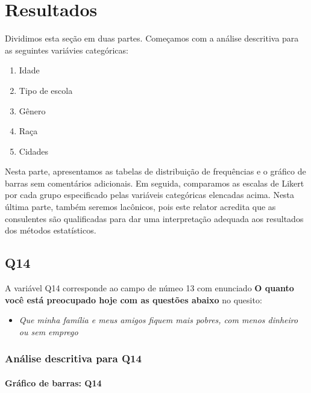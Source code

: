 \documentclass[]{article}
\providecommand{\tightlist}{%
  \setlength{\itemsep}{0pt}\setlength{\parskip}{0pt}}
\let\oldparagraph\paragraph
\renewcommand{\paragraph}[1]{\oldparagraph{#1}\mbox{}}
\begin{document}
\cleardoublepage

\hypertarget{resultados}{%
\section{Resultados}\label{resultados}}

Dividimos esta seção em duas partes. Começamos com a análise descritiva para as seguintes variávies categóricas:

\begin{enumerate}
\def\labelenumi{\roman{enumi}.}
\tightlist
\item
  Idade
\item
  Tipo de escola
\item
  Gênero
\item
  Raça
\item
  Cidades
\end{enumerate}

Nesta parte, apresentamos as tabelas de distribuição de frequências e o gráfico de barras sem comentários adicionais. Em seguida, comparamos as escalas de Likert por cada grupo especificado pelas variáveis categóricas elencadas acima. Nesta última parte, também seremos lacônicos, pois este relator acredita que as consulentes são qualificadas para dar uma interpretação adequada aos resultados dos métodos estatísticos.

\cleardoublepage

\hypertarget{q14}{%
\subsection{Q14}\label{q14}}

A variável Q14 corresponde ao campo de númeo 13 com enunciado \textbf{O quanto você está preocupado hoje com as questões abaixo} no quesito:

\begin{itemize}
\tightlist
\item
  \emph{Que minha família e meus amigos fiquem mais pobres, com menos dinheiro ou sem emprego}
\end{itemize}

\hypertarget{anuxe1lise-descritiva-para-q14}{%
\subsubsection{Análise descritiva para Q14}\label{anuxe1lise-descritiva-para-q14}}

\hypertarget{gruxe1fico-de-barras-q14}{%
\paragraph{Gráfico de barras: Q14}\label{gruxe1fico-de-barras-q14}}
\end{document}
